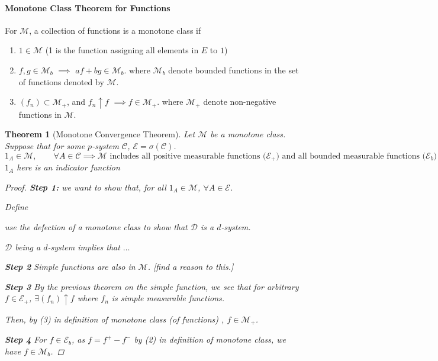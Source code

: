 \documentclass[11pt]{article}
\newtheorem{theorem}{Theorem}[subsection]
\begin{document}
    \paragraph{Monotone Class Theorem for Functions}
    \begin{definition}
      For $\mathcal M$, a collection of functions is a monotone class if 
      \begin{enumerate}
        \item $1 \in \mathcal M$ (1 is the function assigning all elements in $E$ to
          $1$)
        \item $f, g \in \mathcal M_b$ $\implies$ $a f + b g \in \mathcal M_b$. 
          where $\mathcal M_b$ denote bounded functions in the set of functions
          denoted by $\mathcal M$. 

        \item $\left( f_n \right) \subset \mathcal M_ + $, and $f_n \uparrow f$
          $\implies f \in \mathcal M _ +$. 
          where $\mathcal M _ + $ denote non-negative functions in $\mathcal M$. 
      \end{enumerate}
    \end{definition}

    \begin{theorem}[Monotone Convergence Theorem]
      Let $\mathcal M$ be a monotone class. Suppose that for some $p$-system
      $\mathcal C$, $\mathcal E = \sigma (\mathcal C)$. 
      \[ 1 _ A \in \mathcal M, \qquad \forall A \in \mathcal C \implies \mathcal M
        \text{ includes all positive measurable functions ($\mathcal E_+$) and all bounded measurable
        functions ($\mathcal E_b$)}\]
        $1_A$ here is an indicator function


        \begin{proof}
          \textbf{Step 1:} we want to show that, for all $1 _ A \in \mathcal M$,
          $\forall A \in \mathcal E$.

          Define 

          use the defection of a monotone class to show that $\mathcal D$ is a
          $d$-system. 
          \label{homework_02}

          $\mathcal D$ being a $d$-system implies that $\mathcal \dots$

          \textbf{Step 2} Simple functions are also in $\mathcal M$. [find a reason to
          this.]

          \textbf{Step 3} By the previous theorem on the simple function, we see that
          for arbitrary $f \in \mathcal E _ + $, $\exists \left( f_n \right) \uparrow
          f$ where $f_n$ is simple measurable functions.  

          Then, by (3) in definition of monotone class (of functions) , $f \in
          \mathcal M_+$. 

          \textbf{Step 4} For $f \in \mathcal E_b$, as $f = f^+ - f^-$ by (2) in
          definition of monotone class, we have $f \in \mathcal M_b$. 
        \end{proof}

      \end{theorem}
\end{document}
